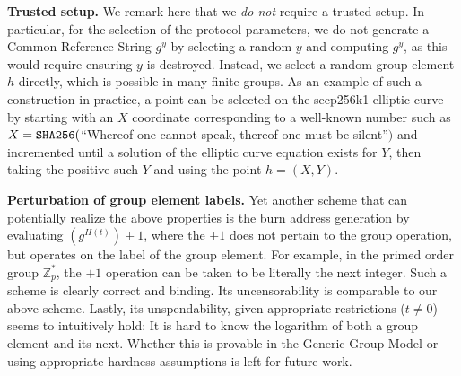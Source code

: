 \noindent
\textbf{Trusted setup.}
We remark here that we \emph{do not} require a trusted setup. In particular, for the selection of the protocol parameters, we do not generate a Common Reference String $g^y$ by selecting a random $y$ and computing $g^y$, as this would require ensuring $y$ is destroyed. Instead, we select a random group element $h$ directly, which is possible in many finite groups. As an example of such a construction in practice, a point can be selected on the secp256k1 elliptic curve by starting with an $X$ coordinate corresponding to a well-known number such as $X = \texttt{SHA256}($``Whereof one cannot speak, thereof one must be silent''$)$ and incremented until a solution of the elliptic curve equation exists for $Y$, then taking the positive such $Y$ and using the point $h = (X, Y)$.

\noindent
\textbf{Perturbation of group element labels.}
Yet another scheme that can potentially realize the above properties is the burn
address generation by evaluating $(g^{H(t)}) + 1$, where the $+1$ does not pertain to
the group operation, but operates on the label of the group element. For
example, in the primed order group $\mathbb{Z}_p^*$, the $+1$ operation can be taken to be literally
the next integer. Such a scheme is clearly correct and binding. Its
uncensorability is comparable to our above scheme. Lastly, its unspendability,
given appropriate restrictions ($t \neq 0$) seems to intuitively hold: It is
hard to know the logarithm of both a group element and its next. Whether this is
provable in the Generic Group Model or using appropriate hardness assumptions is
left for future work.
